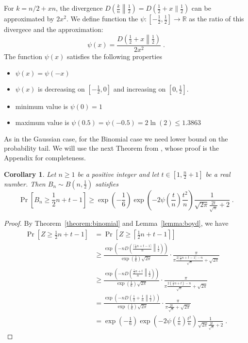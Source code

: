 \documentclass{article}
\newcommand{\field}[1]{\mathbb{#1}}
\newcommand{\R}{\field{R}}
\newtheorem{corollary}[theorem]{Corollary}
\begin{document}
For $k=n/2 + xn$, the divergence $D \left( \frac{k}{n} \middle\| \frac{1}{2} \right) = D \left(\frac{1}{2} + x \| \frac{1}{2} \right)$ can be approximated by $2x^2$.
We define function the $\psi:[-\frac{1}{2},\frac{1}{2}] \to \R$ as the ratio of this divergece and the approximation:
$$
\psi(x) = \frac{D \left(\frac{1}{2}+x \middle\| \frac{1}{2} \right)}{2 x^2} \; .
$$
The function $\psi(x)$ satisfies the following properties
\begin{itemize}
\item $\psi(x) = \psi(-x)$
\item $\psi(x)$ is decreasing on $[-\frac{1}{2}, 0]$ and increasing on $[0, \frac{1}{2}]$.
\item minimum value is $\psi(0) = 1$
\item maximum value is $\psi(0.5) = \psi(-0.5) = 2 \ln(2) \le 1.3863$
\end{itemize}

As in the Gaussian case, for the Binomial case we need lower bound on the
probability tail.  We will use the next Theorem from \cite{nOrabona13}, whose
proof is the Appendix for completeness.

\begin{corollary}
Let $n \ge 1$ be a positive integer and let $t \in [1, \frac{n}{2} + 1]$ be a real number. Then $B_n \sim B(n, \frac{1}{2})$ satisfies
$$
\Pr \left[ B_n \ge \frac{1}{2} n + t - 1 \right] \ge \exp\left(-\frac{1}{6}\right) \exp\left(- 2 \psi\left(\frac{t}{n}\right) \frac{t^2}{n} \right) \frac{1}{\sqrt{2\pi} \frac{2 t}{\sqrt{n}} + 2} \; .
$$
\end{corollary}

\begin{proof}
By Theorem~\ref{theorem:binomial} and Lemma~\ref{lemma:boyd}, we have
\begin{align*}
\Pr \left[ Z \ge  \frac{1}{2} n + t - 1 \right]
& = \Pr \left[ Z \ge \left\lceil \frac{1}{2} n + t - 1 \right\rceil \right] \\
& \ge \frac{\exp\left(-n D \left(\frac{\lceil \frac{1}{2}n + t - 1 \rceil}{n} \middle\| \frac{1}{2} \right)\right)}{\exp\left(\frac{1}{6}\right) \sqrt{2 \pi}} \cdot \frac{\pi}{\pi \frac{2\lceil \frac{1}{2}n + t - 1 \rceil - n}{\sqrt{n}} + \sqrt{2 \pi}} \\
& \ge \frac{\exp\left(-n D \left(\frac{\frac{1}{2}n + t}{n} \middle\| \frac{1}{2} \right)\right)}{\exp\left(\frac{1}{6}\right) \sqrt{2 \pi}} \cdot \frac{\pi}{\pi \frac{2 (\frac{1}{2}n + t) - n}{\sqrt{n}} + \sqrt{2 \pi}} \\
& = \frac{\exp\left(-n D \left(\frac{1}{2} + \frac{t}{n} \middle\| \frac{1}{2} \right)\right)}{\exp\left(\frac{1}{6}\right) \sqrt{2 \pi}} \cdot \frac{\pi}{\pi \frac{2t}{\sqrt{n}} + \sqrt{2 \pi}} \\
& = \exp\left(-\frac{1}{6}\right) \exp\left(- 2 \psi\left(\frac{t}{n}\right) \frac{t^2}{n} \right) \frac{1}{\sqrt{2\pi} \frac{2 t}{\sqrt{n}} + 2} \; .
\end{align*}
\end{proof}
\end{document}
